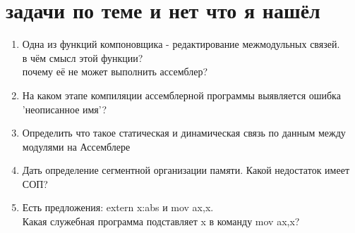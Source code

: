 \documentclass[a4paper,10pt]{article}
\begin{document}
\section*{задачи по теме и нет что я нашёл}
\begin{enumerate}
    \item Одна из функций компоновщика - редактирование межмодульных  связей. \\
    в чём смысл этой функции?\\
    почему её не может выполнить ассемблер?
    \item На каком этапе компиляции ассемблерной программы выявляется ошибка 'неописанное имя'?
    \item Определить что такое статическая и динамическая связь по данным между модулями на Ассемблере 
    \item Дать определение сегментной организации памяти. Какой недостаток имеет СОП?
    \item Есть предложения: extern x:abs и mov ax,x. \\
    Какая служебная программа подставляет x в команду mov ax,x?
\end{enumerate}
\end{document}
